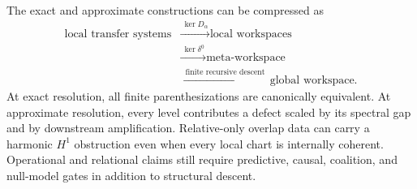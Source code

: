 
The exact and approximate constructions can be compressed as
\[
\boxed{
\begin{aligned}
\text{local transfer systems}
&\xrightarrow{\ \ker D_\alpha\ }
\text{local workspaces}\\
&\xrightarrow{\ \ker\delta^0\ }
\text{meta-workspace}\\
&\xrightarrow{\ \text{finite recursive descent}\ }
\text{global workspace}.
\end{aligned}
}
\]
At exact resolution, all finite parenthesizations are canonically equivalent.
At approximate resolution, every level contributes a defect scaled by its
spectral gap and by downstream amplification. Relative-only overlap data can
carry a harmonic \(H^1\) obstruction even when every local chart is internally
coherent. Operational and relational claims still require predictive, causal,
coalition, and null-model gates in addition to structural descent.
